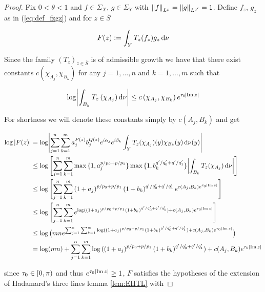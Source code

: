 \begin{proof}
	Fix $0 < \theta < 1$ and $f \in \Sigma_X$, $g \in \Sigma_Y$ with $\norm[0]{f}_{L^p} = \norm[0]{g}_{L^{q'}} = 1$. Define $f_z$, $g_z$ as in (\ref{eq:def_fzgz}) and for $z \in \overline{S}$

	\begin{equation*}
		F(z) := \int_Y T_z(f_z)g_z \mathop{}\!\mathrm{d}\nu	
	\end{equation*}

	Since the family $(T_z)_{z \in \overline{S}}$ is of admissible growth we have that there exist constants $c(\chi_{A_j},\chi_{B_k})$ for any $j = 1,\dots,n$ and $k = 1,\dots,m$ such that 

	\begin{equation*}
		\log\abs[3]{\int_{B_k}T_z\del[0]{\chi_{A_j}}\d \nu} \leq c\del[0]{\chi_{A_j},\chi_{B_k}}e^{\tau_0\abs{\Im z}}
	\end{equation*}

	For shortness we will denote these constants simply by $c(A_j,B_k)$ and get

	\begin{gather*}
		\begin{aligned}
			\log \abs[0]{ F(z) } &= \log \abs[4]{ \sum_{j = 1}^n\sum_{k = 1}^m a^{P(z)}_j b_j^{Q(z)} e^{i\alpha_j} e^{i\beta_k} \int_YT_z(\chi_{A_j})(y)\chi_{B_k}(y)\d\nu(y)}\\
			&\leq \log \sbr[4]{ \sum_{j = 1}^n\sum_{k = 1}^m \max\cbr[0]{1,a_j^{p/p_0 + p/p_1}}\max\cbr[0]{1,b_k^{q'/q'_0 + q'/q'_1}} \abs[3]{\int_{B_k} T_z(\chi_{A_j}) \d\nu}}\\
			&\leq \log\sbr[4]{ \sum_{j = 1}^n\sum_{k = 1}^m \del[0]{ 1 + a_j}^{p/p_0 + p/p_1} \del[0]{1 + b_k}^{q'/q'_0 + q'/q'_1} e^{c(A_j,B_k)e^{\tau_0 \abs[0]{ \Im z}}} }\\
			&\leq  \log\sbr[4]{ \sum_{j = 1}^n\sum_{k = 1}^m e^{\log\del[0]{\del[0]{ 1 + a_j}^{p/p_0 + p/p_1}\del[0]{ 1 + b_k}^{q'/q'_0 + q'/q'_1}} + c(A_j,B_k)e^{\tau_0 \abs[0]{ \Im z}}} }\\
			&\leq \log\del[1]{ mn e^{\sum_{j = 1}^n\sum_{k = 1}^m\log\del[0]{\del[0]{ 1 + a_j}^{p/p_0 + p/p_1} \del[0]{1 + b_k}^{q'/q'_0 + q'/q'_1}} + c(A_j,B_k)e^{\tau_0 \abs[0]{ \Im z}}} }\\
			&= \log(mn) + \sum_{j = 1}^n\sum_{k = 1}^m\log\del[0]{\del[0]{1 + a_j}^{p/p_0 + p/p_1}\del[0]{1 +  b_k}^{q'/q'_0 + q'/q'_1}} + c(A_j,B_k)e^{\tau_0 \abs[0]{ \Im z}}
		\end{aligned}
	\end{gather*}

	\noindent since $\tau_0 \in \intco{0,\pi}$ and thus $e^{\tau_0 \abs[0]{ \Im z}} \geq 1$, $F$ satisfies the hypotheses of the extension of Hadamard's three lines lemma \ref{lem:EHTL} with 


\end{proof}
